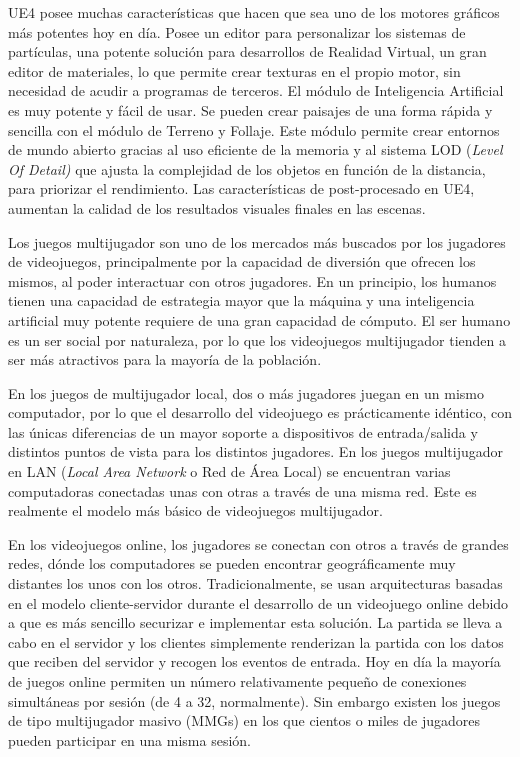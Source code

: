 \acs{UE4} posee muchas características que hacen que sea uno de los motores gráficos más potentes hoy en día. Posee un editor para personalizar los sistemas de partículas, una potente solución para desarrollos de Realidad Virtual, un gran editor de materiales, lo que permite crear texturas en el propio motor, sin necesidad de acudir a programas de terceros. El módulo de Inteligencia Artificial es muy potente y fácil de usar. Se pueden crear paisajes de una forma rápida y sencilla con el módulo de Terreno y Follaje. Este módulo permite crear entornos de mundo abierto gracias al uso eficiente de la memoria y al sistema LOD (\textit{Level Of Detail)} que ajusta la complejidad de los objetos en función de la distancia, para priorizar el rendimiento. Las características de post-procesado en \acs{UE4}, aumentan la calidad de los resultados visuales finales en las escenas.

Los juegos multijugador \cite{7} son uno de los mercados más buscados por los jugadores de videojuegos, principalmente por la capacidad de diversión que ofrecen los mismos, al poder interactuar con otros jugadores. En un principio, los humanos tienen una capacidad de estrategia mayor que la máquina y una inteligencia artificial muy potente requiere de una gran capacidad de cómputo. El ser humano es un ser social por naturaleza, por lo que los videojuegos multijugador tienden a ser más atractivos para la mayoría de la población.

En los juegos de multijugador local, dos o más jugadores juegan en un mismo computador, por lo que el desarrollo del videojuego es prácticamente idéntico, con las únicas diferencias de un mayor soporte a dispositivos de entrada/salida y distintos puntos de vista para los distintos jugadores. En los juegos multijugador en LAN (\textit{Local Area Network} o Red de Área Local) se encuentran varias computadoras conectadas unas con otras a través de una misma red. Este es realmente el modelo más básico de videojuegos multijugador.

En los videojuegos online, los jugadores se conectan con otros a través de grandes redes, dónde los computadores se pueden encontrar geográficamente muy distantes los unos con los otros. Tradicionalmente, se usan arquitecturas basadas en el modelo cliente-servidor \cite{8} durante el desarrollo de un videojuego online debido a que es más sencillo securizar e implementar esta solución. La partida se lleva a cabo en el servidor y los clientes simplemente renderizan la partida con los datos que reciben del servidor y recogen los eventos de entrada. Hoy en día la mayoría de juegos online permiten un número relativamente pequeño de conexiones simultáneas por sesión (de 4 a 32, normalmente). Sin embargo existen los juegos de tipo multijugador masivo (MMGs) en los que cientos o miles de jugadores pueden participar en una misma sesión.

